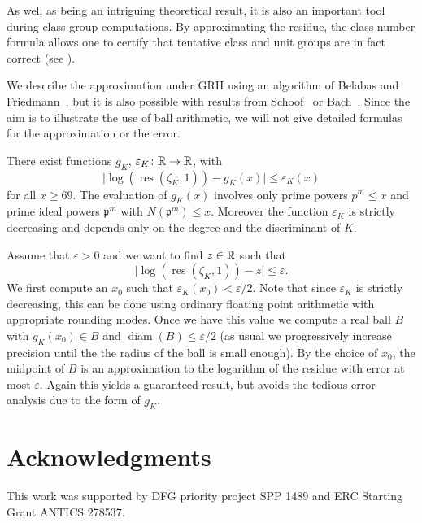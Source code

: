 \documentclass{sig-alternate-05-2015}
\begin{document}
As well as being an intriguing theoretical result, it is also an important tool during class group computations.
By approximating the residue, the class number formula allows one to certify that tentative class and unit groups are in fact
correct (see \cite{Biasse2014}).

We describe the approximation under GRH using an algorithm of Belabas and Friedmann~\cite{Belabas2015}, but it is also possible with
results from Schoof~\cite{Schoof1982} or Bach~\cite{Bach1995}.
Since the aim is to illustrate the use of ball arithmetic, we will not give detailed formulas for the approximation or the error.

\begin{theorem}
There exist functions $g_K$, $\varepsilon_K \colon \mathbb{R} \to \mathbb{R}$, with
\[ \lvert \log(\operatorname{res}(\zeta_K, 1)) - g_K(x) \rvert \leq \varepsilon_K(x) \]
for all $x \geq 69$. The evaluation of $g_K(x)$ involves only prime powers $p^m \leq x$ and prime ideal powers $\mathfrak p^m$ with
$N(\mathfrak p^m) \leq x$. Moreover the function $\varepsilon_K$ is strictly decreasing and depends only on the degree and the
discriminant of $K$.
\end{theorem}

Assume that $\varepsilon > 0$ and we want to find $z \in \mathbb{R}$ such that
\[ \lvert \log(\operatorname{res}(\zeta_K, 1)) - z \rvert \leq \varepsilon.\]
We first compute an $x_0$ such that $\varepsilon_K(x_0) < \varepsilon/2$. Note that since $\varepsilon_K$ is strictly decreasing,
this can be done using ordinary floating point arithmetic with appropriate rounding modes.
Once we have this value we compute a real ball $B$ with $g_K(x_0) \in B$ and $\operatorname{diam}(B) \leq \varepsilon/2$ (as usual
we progressively increase precision until the the radius of the ball is small enough).
By the choice of $x_0$, the midpoint of $B$ is an approximation to the logarithm of the residue with error at most $\varepsilon$.
Again this yields a guaranteed result, but avoids the tedious error analysis due to the form of $g_K$.

\section{Acknowledgments}

This work was supported by DFG priority project SPP 1489 and ERC Starting Grant ANTICS 278537.
\end{document}
